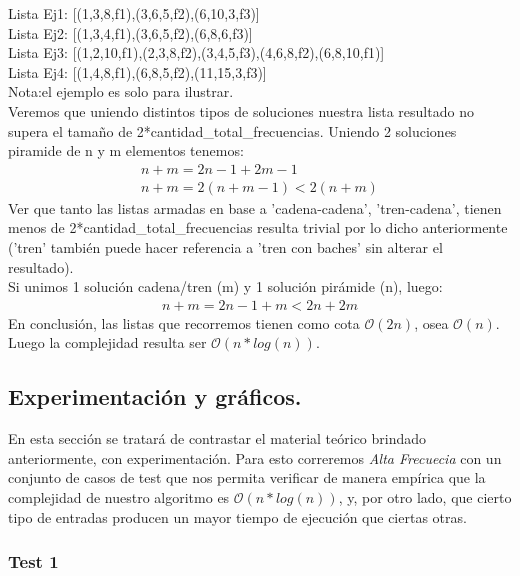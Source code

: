 Lista Ej1: [(1,3,8,f1),(3,6,5,f2),(6,10,3,f3)]\\
Lista Ej2: [(1,3,4,f1),(3,6,5,f2),(6,8,6,f3)]\\
Lista Ej3: [(1,2,10,f1),(2,3,8,f2),(3,4,5,f3),(4,6,8,f2),(6,8,10,f1)]\\
Lista Ej4: [(1,4,8,f1),(6,8,5,f2),(11,15,3,f3)]\\
Nota:el ejemplo es solo para ilustrar.\\
Veremos que uniendo distintos tipos de soluciones nuestra lista resultado no supera el tamaño de 2*cantidad_total_frecuencias.
Uniendo 2 soluciones piramide de n y m elementos tenemos:\\
\begin{equation*}
\begin{array}{l}
n+m = 2n-1+2m-1\\
n+m = 2(n+m-1)<2(n+m)
\end{array}
\end{equation*}
Ver que tanto las listas armadas en base a 'cadena-cadena', 'tren-cadena', tienen menos de 2*cantidad_total_frecuencias resulta trivial por lo dicho anteriormente ('tren' también puede hacer referencia a 'tren con baches' sin alterar el resultado).\\
Si unimos 1 solución cadena/tren (m) y 1 solución pirámide (n), luego:
\begin{equation*}
\begin{array}{l}
n+m=2n-1+m<2n+2m
\end{array}
\end{equation*}
En conclusión, las listas que recorremos tienen como cota $\mathcal{O}(2n)$, osea $\mathcal{O}(n)$. 
Luego la complejidad resulta ser $\mathcal{O}(n*log(n))$.
\vspace*{0.6cm}

\subsection{Experimentación y gráficos.}

En esta sección se tratará de contrastar el material teórico brindado anteriormente, con experimentación. Para esto correremos {\it Alta Frecuecia} con un conjunto de casos de test que nos permita verificar de manera empírica que la complejidad de nuestro algoritmo es $\mathcal{O}(n*log(n))$, y, por otro lado, que cierto tipo de entradas producen un mayor tiempo de ejecución que ciertas otras.

\subsubsection{Test 1}

